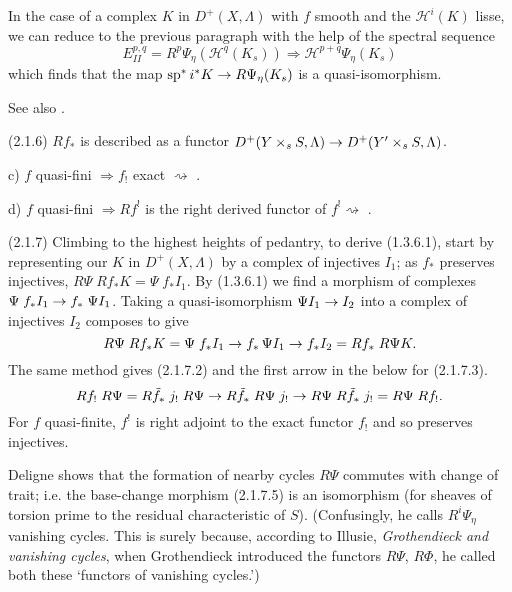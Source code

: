 \documentclass[deligne.tex]{subfiles}
\begin{document}
In the case of a complex $K$ in $D^+(X,\Lambda)$ with $f$ smooth and
the $\mathscr H^i(K)$ lisse, we can reduce to the previous paragraph with
the help of the spectral sequence
\begin{equation*}
	E_{II}^{p,q}=R^p\Psi_\eta(\mathscr H^q(K_s))
	\Rightarrow\mathscr H^{p+q}\Psi_\eta(K_s)
\end{equation*}
which finds that the map $\operatorname{sp}^*i^*K\rightarrow R\Psi_\eta(K_s)$ is a
quasi-isomorphism.

See also \cite[2.12]{thfin}.

(2.1.6) $Rf_*$ is described as a functor
$D^+(Y\times_sS,\Lambda)\rightarrow D^+(Y'\times_sS,\Lambda)$.

c) $f$ quasi-fini $\Rightarrow f_!$ exact $\rightsquigarrow$ \cite[XVII 6.1.4]{SGAA}.

d) $f$ quasi-fini $\Rightarrow Rf^!$ is the right derived functor of
$f^!\rightsquigarrow$ \cite[XVIII 3.1.8 (i)]{SGAA}.

(2.1.7) Climbing to the highest heights of pedantry, to derive (1.3.6.1),
start by representing our $K$ in $D^+(X,\Lambda)$ by a complex of
injectives $I_1$; as $f_*$ preserves injectives, 
$R\Psi\;Rf_*K=\Psi\;f_*I_1$. By (1.3.6.1) we find a morphism of complexes
$\Psi\;f_*I_1\rightarrow f_*\;\Psi I_1$. Taking a quasi-isomorphism
$\Psi I_1\rightarrow I_2$ into a complex of injectives $I_2$ composes to give
\begin{equation*}
	R\Psi\;Rf_*K=\Psi\;f_*I_1\rightarrow f_*\,\Psi I_1\rightarrow f_* I_2=Rf_*\;R\Psi K.
\end{equation*}
The same method gives (2.1.7.2) and the first arrow in the below for
(2.1.7.3).
\begin{equation*}
	Rf_!\;R\Psi=R\tilde f_*\;j_!\;R\Psi\rightarrow R\tilde f_*\;R\Psi\;j_!\rightarrow
	R\Psi\;R\tilde f_*\;j_!=R\Psi\;Rf_!.
\end{equation*}
For $f$ quasi-finite, $f^!$ is right adjoint to the exact functor $f_!$
and so preserves injectives.

Deligne shows \cite[3.7]{thfin} that the formation of nearby cycles $R\Psi$
commutes with change of trait; i.e. the base-change morphism (2.1.7.5) is
an isomorphism (for sheaves of torsion prime to the residual characteristic 
of $S$).
(Confusingly, he calls $R^i\Psi_\eta$ vanishing cycles. This is surely 
because, according to Illusie, \emph{Grothendieck and vanishing cycles},
 when Grothendieck introduced the functors $R\Psi$, $R\Phi$, he
called both these `functors of vanishing cycles.')
\end{document}
